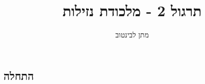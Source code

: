\documentclass[a4paper,11pt]{article}
\title{תרגול 2 - מלכודת נזילות}
\author{מתן לבינטוב}
\date{}
\begin{document}
\begin{RTL}
    
\maketitle
\section{התחלה}




\end{RTL}
\end{document}
